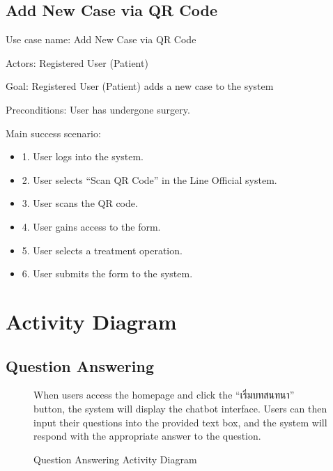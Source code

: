 \documentclass[12pt,oneside,openright,a4paper]{cpe-english-project}
\begin{document}
      \subsection{Add New Case via QR Code}
        \qquad Use case name: Add New Case via QR Code \par
        \qquad Actors: Registered User (Patient) \par
        \qquad Goal: Registered User (Patient) adds a new case to the system\par
        \qquad Preconditions: User has undergone surgery. \par
        \qquad Main success scenario:
        \begin{itemize}
          \item[] 1. User logs into the system.
          \item[] 2. User selects “Scan QR Code” in the Line Official system.
          \item[] 3. User scans the QR code.
          \item[] 4. User gains access to the form.
          \item[] 5. User selects a treatment operation.
          \item[] 6. User submits the form to the system.
        \end{itemize}

\newpage
    \section{Activity Diagram}
      \subsection{Question Answering}
      \begin{figure}[!h]
        \centering
        \caption{Question Answering Activity Diagram}\label{fig:AD_FAQ}
        \begin{flushleft}
          \qquad When users access the homepage and click the “\textthai{เริ่มบทสนทนา}” button, the system will display the chatbot interface. Users can then input their questions into the provided text box, and the system will respond with the appropriate answer to the question. \par
        \end{flushleft}
      \end{figure}
\end{document}
